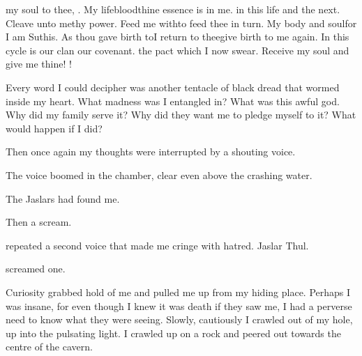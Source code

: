\documentclass
  [a4paper,
   12pt,
   oneside
  ]%
  {article}
\begin{document}
\begin{diary}%
  \prikker my soul to thee, \Ubloth.
  My lifeblood\prikker thine essence is in me. 
  \prikker in this life and the next. 
  Cleave unto me\prikker thy power. 
  Feed me with\prikker to feed thee in turn. 
  My body and soul\prikker for I am Suthis. 
  As thou gave birth to\prikker I return to thee\prikker give birth to me again. 
  In this cycle is our clan\prikker 
  \prikker our covenant.
  \prikker the pact which I now swear. 
  Receive my soul and give me thine!
  \Ubloth!
\end{diary}

Every word I could decipher was another tentacle of black dread that wormed inside my heart. 
What madness was I entangled in?
What was this awful god.
Why did my family serve it? 
Why did they want me to pledge myself to it? 
What would happen if I did?

Then once again my thoughts were interrupted by a shouting voice. 

The voice boomed in the chamber, clear even above the crashing water. 

The Jaslars had found me. 

Then a scream. 


 repeated a second voice that made me cringe with hatred. 
Jaslar Thul.


 screamed one.

Curiosity grabbed hold of me and pulled me up from my hiding place. 
Perhaps I was insane, for even though I knew it was death if they saw me, I had a perverse need to know what they were seeing. 
Slowly, cautiously I crawled out of my hole, up into the pulsating light. 
I crawled up on a rock and peered out towards the centre of the cavern.
\end{document}
